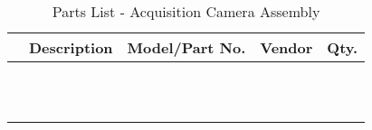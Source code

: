 \begin{table}[htbp]
    \renewcommand{\arraystretch}{1.25}
    \caption{Parts List - Acquisition Camera Assembly}
    \begin{center}
        \begin{tabular}{ l l l l l }
        \toprule[2pt]
        \textbf{} & \textbf{Description} & \textbf{Model/Part No.}  & \textbf{Vendor} & \textbf{Qty.} \\
        \midrule[0.75pt]
        &  &  &  &  \\
        &  &  &  &  \\
        &  &  &  &  \\
        &  &  &  &  \\
        &  &  &  &  \\
        &  &  &  &  \\
        &  &  &  &  \\
        &  &  &  &  \\
        &  &  &  &  \\
        &  &  &  &  \\
        &  &  &  &  \\
        \bottomrule[2pt]
        \end{tabular}
        \label{tab:parts_list_acq_assy}
    \end{center}
\end{table}

